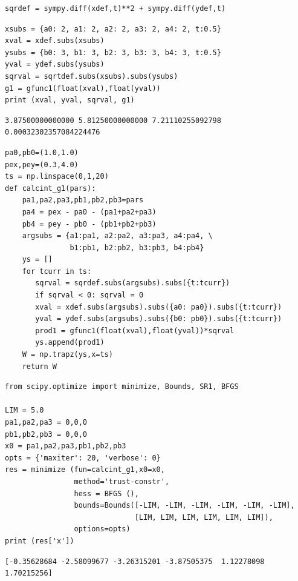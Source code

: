 \documentclass[12pt,fleqn]{article}\usepackage{../../common}
\begin{document}
\begin{verbatim}
sqrdef = sympy.diff(xdef,t)**2 + sympy.diff(ydef,t)
\end{verbatim}

\begin{verbatim}
xsubs = {a0: 2, a1: 2, a2: 2, a3: 2, a4: 2, t:0.5}
xval = xdef.subs(xsubs)
ysubs = {b0: 3, b1: 3, b2: 3, b3: 3, b4: 3, t:0.5}
yval = ydef.subs(ysubs)
sqrval = sqrtdef.subs(xsubs).subs(ysubs)
g1 = gfunc1(float(xval),float(yval))
print (xval, yval, sqrval, g1)
\end{verbatim}

\begin{verbatim}
3.87500000000000 5.81250000000000 7.21110255092798 0.00032302357084224476
\end{verbatim}

\begin{verbatim}
pa0,pb0=(1.0,1.0)
pex,pey=(0.3,4.0)
ts = np.linspace(0,1,20)
def calcint_g1(pars):
    pa1,pa2,pa3,pb1,pb2,pb3=pars
    pa4 = pex - pa0 - (pa1+pa2+pa3)
    pb4 = pey - pb0 - (pb1+pb2+pb3)
    argsubs = {a1:pa1, a2:pa2, a3:pa3, a4:pa4, \
               b1:pb1, b2:pb2, b3:pb3, b4:pb4}
    ys = []
    for tcurr in ts:
       sqrval = sqrdef.subs(argsubs).subs({t:tcurr})
       if sqrval < 0: sqrval = 0    
       xval = xdef.subs(argsubs).subs({a0: pa0}).subs({t:tcurr})
       yval = ydef.subs(argsubs).subs({b0: pb0}).subs({t:tcurr})
       prod1 = gfunc1(float(xval),float(yval))*sqrval
       ys.append(prod1)
    W = np.trapz(ys,x=ts)
    return W
\end{verbatim}


\begin{verbatim}
from scipy.optimize import minimize, Bounds, SR1, BFGS

LIM = 5.0
pa1,pa2,pa3 = 0,0,0
pb1,pb2,pb3 = 0,0,0
x0 = pa1,pa2,pa3,pb1,pb2,pb3
opts = {'maxiter': 20, 'verbose': 0}
res = minimize (fun=calcint_g1,x0=x0,
                method='trust-constr',
                hess = BFGS (),
                bounds=Bounds([-LIM, -LIM, -LIM, -LIM, -LIM, -LIM],
                              [LIM, LIM, LIM, LIM, LIM, LIM]),
                options=opts)
print (res['x'])
\end{verbatim}

\begin{verbatim}
[-0.35628684 -2.58099677 -3.26315201 -3.87505375  1.12278098  1.70215256]
\end{verbatim}
\end{document}
